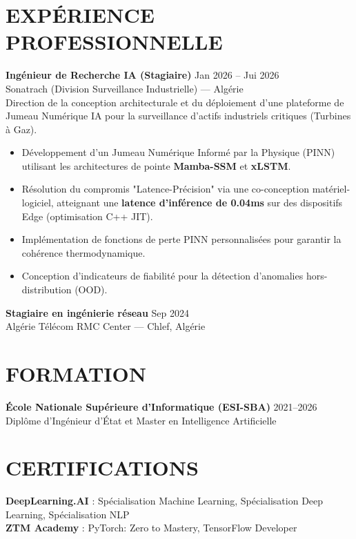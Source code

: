 \documentclass[a4paper,12pt]{article}
\begin{document}
\section{EXPÉRIENCE PROFESSIONNELLE}
\textbf{Ingénieur de Recherche IA (Stagiaire)} \hfill Jan 2026 -- Jui 2026 \\
Sonatrach (Division Surveillance Industrielle) — Algérie \\
Direction de la conception architecturale et du déploiement d'une plateforme de Jumeau Numérique IA pour la surveillance d'actifs industriels critiques (Turbines à Gaz).
\begin{itemize}
    \item Développement d'un Jumeau Numérique Informé par la Physique (PINN) utilisant les architectures de pointe \textbf{Mamba-SSM} et \textbf{xLSTM}.
    \item Résolution du compromis "Latence-Précision" via une co-conception matériel-logiciel, atteignant une \textbf{latence d'inférence de 0.04ms} sur des dispositifs Edge (optimisation C++ JIT).
    \item Implémentation de fonctions de perte PINN personnalisées pour garantir la cohérence thermodynamique.
    \item Conception d'indicateurs de fiabilité pour la détection d'anomalies hors-distribution (OOD).
\end{itemize}

\textbf{Stagiaire en ingénierie réseau} \hfill Sep 2024 \\
Algérie Télécom RMC Center — Chlef, Algérie

\section{FORMATION}
\textbf{École Nationale Supérieure d’Informatique (ESI-SBA)} \hfill 2021--2026 \\
Diplôme d’Ingénieur d'État et Master en Intelligence Artificielle

\section{CERTIFICATIONS}
\textbf{DeepLearning.AI} : Spécialisation Machine Learning, Spécialisation Deep Learning, Spécialisation NLP \\
\textbf{ZTM Academy} : PyTorch: Zero to Mastery, TensorFlow Developer

\end{document}
